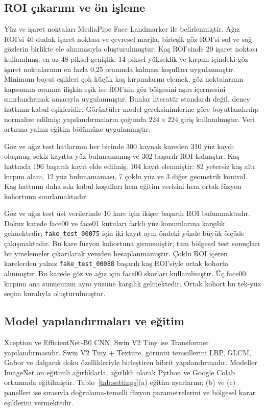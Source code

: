 \documentclass[a4paper]{elektr}
\begin{document}
\subsection{ROI çıkarımı ve ön işleme}
Yüz ve işaret noktaları MediaPipe Face Landmarker ile belirlenmiştir. Ağız ROI'si 40 dudak işaret noktası ve çevresel marjla, birleşik göz ROI'si sol ve sağ gözlerin birlikte ele alınmasıyla oluşturulmuştur. Kaş ROI'sinde 20 işaret noktası kullanılmış; en az 48 piksel genişlik, 14 piksel yükseklik ve kırpım içindeki göz işaret noktalarının en fazla 0,25 oranında kalması koşulları uygulanmıştır. Minimum boyut eşikleri çok küçük kaş kırpımlarını elemek, göz noktalarının kapsanma oranına ilişkin eşik ise ROI’nin göz bölgesini aşırı içermesini sınırlandırmak amacıyla uygulanmıştır. Bunlar literatür standardı değil, deney hattının kabul eşikleridir. Görüntüler model gereksinimlerine göre boyutlandırılıp normalize edilmiş; yapılandırmaların çoğunda $224 \times 224$ giriş kullanılmıştır. Veri artırma yalnız eğitim bölümüne uygulanmıştır.

Göz ve ağız test hatlarının her birinde 300 kaynak kareden 310 yüz kaydı oluşmuş; sekiz kayıtta yüz bulunamamış ve 302 başarılı ROI kalmıştır. Kaş hattında 196 başarılı kayıt elde edilmiş, 104 kayıt elenmiştir: 82 yetersiz kaş altı kırpım alanı, 12 yüz bulunamaması, 7 çoklu yüz ve 3 diğer geometrik kontrol. Kaş hattının daha sıkı kabul koşulları hem eğitim verisini hem ortak füzyon kohortunu sınırlamaktadır.

Göz ve ağız test üst verilerinde 10 kare için ikişer başarılı ROI bulunmaktadır. Dokuz karede face00 ve face01 kutuları farklı yüz konumlarına karşılık gelmektedir; \texttt{fake\_test\_00075} için iki kayıt aynı öndeki yüzde büyük ölçüde çakışmaktadır. Bu kare füzyon kohortuna girmemiştir; tam bölgesel test sonuçları bu yinelemeler çıkarılarak yeniden hesaplanmamıştır. Çoklu ROI içeren karelerden yalnız \texttt{fake\_test\_00088} başarılı kaş ROI'siyle ortak kohorta alınmıştır. Bu karede göz ve ağız için face00 skorları kullanılmıştır. Üç face00 kırpımı ana sunucunun aynı yüzüne karşılık gelmektedir. Ortak kohort bu tek-yüz seçim kuralıyla oluşturulmuştur.

\subsection{Model yapılandırmaları ve eğitim}
Xception ve EfficientNet-B0 CNN, Swin V2 Tiny ise Transformer yapılandırmasıdır. Swin V2 Tiny + Texture, görüntü temsillerini LBP, GLCM, Gabor ve dalgacık doku özellikleriyle birleştiren hibrit yapılandırmadır. Modeller ImageNet ön eğitimli ağırlıklarla, ağırlıklı olarak Python ve Google Colab ortamında eğitilmiştir. Tablo~\ref{tab:settings}(a) eğitim ayarlarını; (b) ve (c) panelleri ise sırasıyla doğrulama-temelli füzyon parametrelerini ve bölgesel karar eşiklerini vermektedir.
\end{document}
